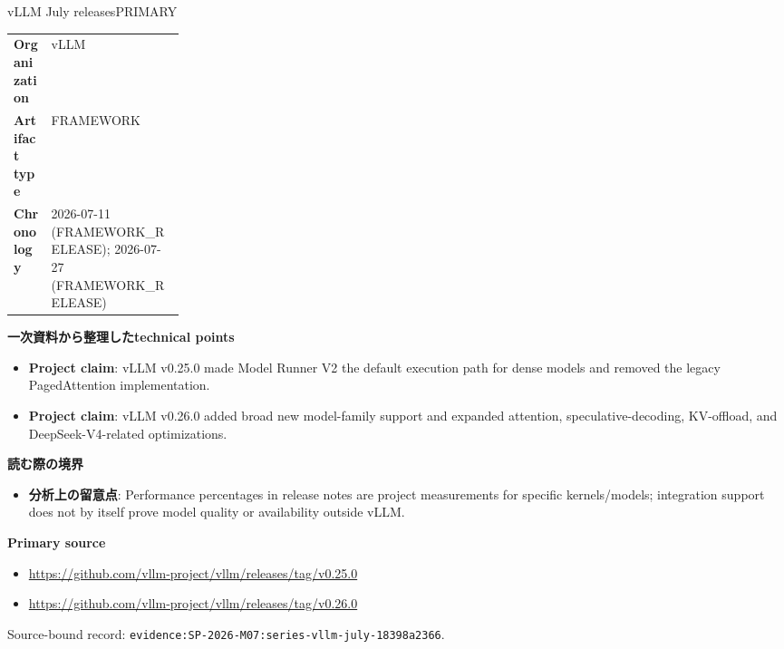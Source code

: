 \begin{technicalnote}{vLLM July releases}{PRIMARY}
\begin{tabularx}{\linewidth}{@{}>{\bfseries}p{0.22\linewidth}X@{}}
Organization & vLLM \\
Artifact type & FRAMEWORK \\
Chronology & 2026-07-11 (FRAMEWORK\_RELEASE); 2026-07-27 (FRAMEWORK\_RELEASE) \\
\end{tabularx}
\smallskip
{\bfseries 一次資料から整理したtechnical points}
\begin{itemize}[leftmargin=1.5em,itemsep=0.35em]
\item \textbf{Project claim}: vLLM v0.25.0 made Model Runner V2 the default execution path for dense models and removed the legacy PagedAttention implementation.
\item \textbf{Project claim}: vLLM v0.26.0 added broad new model-family support and expanded attention, speculative-decoding, KV-offload, and DeepSeek-V4-related optimizations.
\end{itemize}
{\bfseries 読む際の境界}
\begin{itemize}[leftmargin=1.5em,itemsep=0.35em]
\item \textbf{分析上の留意点}: Performance percentages in release notes are project measurements for specific kernels/models; integration support does not by itself prove model quality or availability outside vLLM.
\end{itemize}
{\bfseries Primary source}
\begin{itemize}[leftmargin=1.5em,itemsep=0.25em]
\item \url{https://github.com/vllm-project/vllm/releases/tag/v0.25.0}
\item \url{https://github.com/vllm-project/vllm/releases/tag/v0.26.0}
\end{itemize}
{\scriptsize\color{SurveyMuted}Source-bound record: \texttt{evidence:SP-2026-M07:series-vllm-july-18398a2366}.}
\end{technicalnote}
\medskip


